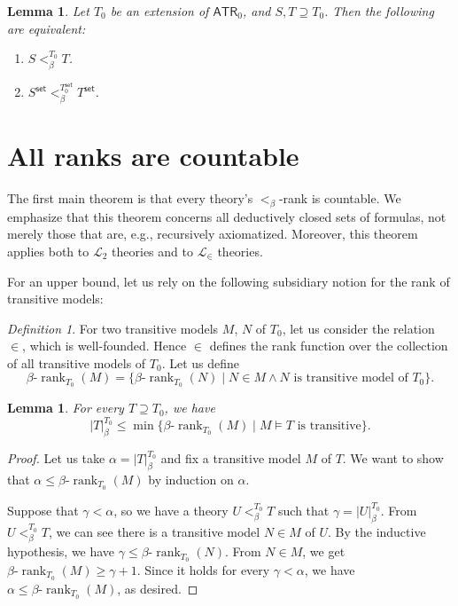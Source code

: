 \documentclass{amsart}
\newtheorem{lemma}[theorem]{Lemma}
\theoremstyle{remark}
\newtheorem{definition}[definition]{Definition}
\newcommand{\ATR}{\mathsf{ATR}}
\newcommand{\set}{\mathsf{set}}
\newcommand{\betarank}{\beta\text{-}\operatorname{rank}}
\begin{document}
\begin{lemma} \label{Lemma: Two notions of beta rank are the same} \pushQED{\qed}
    Let $T_0$ be an extension of $\ATR_0$, and $S,T\supseteq T_0$. Then the following are equivalent:
    \begin{enumerate}
        \item $S <^{T_0}_\beta T$.
        \item $S^\set <^{T_0^\set}_\beta T^\set$. \qedhere
    \end{enumerate}
\end{lemma}

\section{All ranks are countable}

The first main theorem is that every theory's $<_\beta$-rank is countable. We emphasize that this theorem concerns all deductively closed sets of formulas, not merely those that are, e.g., recursively axiomatized. Moreover, this theorem applies both to $\mathcal{L}_2$ theories and to $\mathcal{L}_\in$ theories.

For an upper bound, let us rely on the following subsidiary notion for the rank of transitive models:
\begin{definition}
    For two transitive models $M$, $N$ of $T_0$, let us consider the relation $\in$, which is well-founded. Hence $\in$ defines the rank function over the collection of all transitive models of $T_0$. Let us define
    \begin{equation*}
        \betarank_{T_0}(M) = \{\betarank_{T_0}(N) \mid N\in M\land\text{$N$ is transitive model of $T_0$}\}.
    \end{equation*}
\end{definition}

\begin{lemma} \label{Lemma: beta rank of a theory is bounded by a beta rank of a model}
    For every $T\supseteq T_0$, we have
    \begin{equation*}
        |T|_{\beta}^{T_0}\le \min \{\betarank_{T_0}(M) \mid M\vDash T\text{ is transitive}\}.
    \end{equation*}
\end{lemma}
\begin{proof}
    Let us take $\alpha = |T|_{\beta}^{T_0}$ and fix a transitive model $M$ of $T$. We want to show that $\alpha \le \betarank_{T_0}(M)$ by induction on $\alpha$.

    Suppose that $\gamma<\alpha$, so we have a theory $U<^{T_0}_{\beta} T$ such that $\gamma=|U|_{\beta}^{T_0}$.
    From $U<^{T_0}_{\beta} T$, we can see there is a transitive model $N\in M$ of $U$. By the inductive hypothesis, we have $\gamma\le \betarank_{T_0}(N)$. From $N\in M$, we get $\betarank_{T_0}(M)\ge \gamma + 1$.
    Since it holds for every $\gamma<\alpha$, we have $\alpha\le \betarank_{T_0}(M)$, as desired.
\end{proof}
\end{document}
